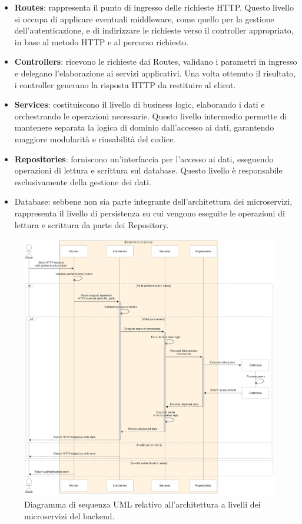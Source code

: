 \begin{itemize}
  \item \textbf{Routes}: rappresenta il punto di ingresso delle richieste HTTP. Questo livello si occupa di applicare eventuali middleware, come quello per la gestione dell'autenticazione, e di indirizzare le richieste verso il controller appropriato, in base al metodo HTTP e al percorso richiesto.

  \item \textbf{Controllers}: ricevono le richieste dai Routes, validano i parametri in ingresso e delegano l'elaborazione ai servizi applicativi. Una volta ottenuto il risultato, i controller generano la risposta HTTP da restituire al client.

  \item \textbf{Services}: costituiscono il livello di business logic, elaborando i dati e orchestrando le operazioni necessarie. Questo livello intermedio permette di mantenere separata la logica di dominio dall'accesso ai dati, garantendo maggiore modularità e riusabilità del codice.

  \item \textbf{Repositories}: forniscono un'interfaccia per l'accesso ai dati, eseguendo operazioni di lettura e scrittura sul database. Questo livello è responsabile esclusivamente della gestione dei dati.

  \item Database: sebbene non sia parte integrante dell'architettura dei microservizi, rappresenta il livello di persistenza su cui vengono eseguite le operazioni di lettura e scrittura da parte dei Repository.
\end{itemize}

\begin{figure}
  \centering
  \includegraphics[width=1\textwidth]{figures/microservice-architecture.png}
  \caption{Diagramma di sequenza UML relativo all'architettura a livelli dei microservizi del backend.}
  \label{fig:microservice-architecture}
\end{figure}

